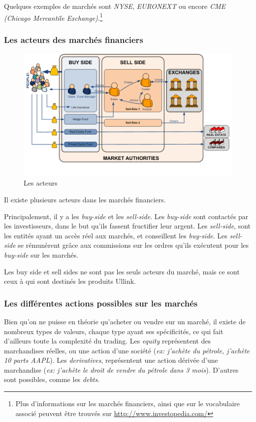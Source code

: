 \documentclass[a4paper, 12pt]{article}
\begin{document}
Quelques exemples de marchés sont \emph{NYSE}, \emph{EURONEXT} ou encore \emph{CME (Chicago Mercantile Exchange)}.\footnote{Plus d'informations sur les marchés financiers, ainsi que sur le vocabulaire associé peuvent être trouvés sur \url{http://www.investopedia.com/}}

\subsubsection{Les acteurs des marchés financiers}

\begin{figure}
\includegraphics[width=\textwidth]{market_actors.png}
\caption{Les acteurs}
\label{market_actors}
\end{figure}

Il existe plusieurs acteurs dans les marchés financiers.

Principalement, il y a les \emph{buy-side} et les \emph{sell-side}. Les \emph{buy-side} sont contactés par les investisseurs, dans le but qu'ils fassent fructifier leur argent. Les \emph{sell-side}, sont les entités ayant un accès réel aux marchés, et conseillent les \emph{buy-side}. Les \emph{sell-side} se rémunèrent grâce aux commissions sur les ordres qu'ils exécutent pour les \emph{buy-side} sur les marchés.

Les buy side et sell sides ne sont pas les seuls acteurs du marché, mais ce sont ceux à qui sont destinés les produits Ullink.


\subsubsection{Les différentes actions possibles sur les marchés}

Bien qu'on ne puisse en théorie qu'acheter ou vendre sur un marché, il existe de nombreux types de valeurs, chaque type ayant ses spécificités, ce qui fait d'ailleurs toute la complexité du trading. Les \emph{equity} représentent des marchandises réelles, ou une action d'une société (\emph{ex: j'achète du pétrole, j'achète 10 parts AAPL}). Les \emph{derivatives}, représentent une action dérivée d'une marchandise (\emph{ex: j'achète le droit de vendre du pétrole dans 3 mois}). D'autres sont possibles, comme les \emph{debts}.
\end{document}
